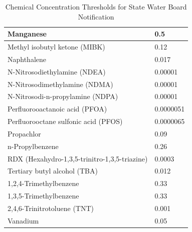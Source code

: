 \begin{table}[]
\begin{tabular}{|l|l|}
Manganese                                                   & 0.5                                             \\ \hline
Methyl   isobutyl   ketone   (MIBK)                         & 0.12                                            \\ \hline
Naphthalene                                                 & 0.017                                           \\ \hline
N-Nitrosodiethylamine   (NDEA)                              & 0.00001                                         \\ \hline
N-Nitrosodimethylamine   (NDMA)                             & 0.00001                                         \\ \hline
N-Nitrosodi-n-propylamine   (NDPA)                          & 0.00001                                         \\ \hline
Perfluorooactanoic   acid   (PFOA)                          & 0.0000051                                       \\ \hline
Perfluorooctane   sulfonic   acid   (PFOS)                  & 0.0000065                                       \\ \hline
Propachlor                                                  & 0.09                                            \\ \hline
n-Propylbenzene                                             & 0.26                                            \\ \hline
RDX (Hexahydro-1,3,5-trinitro-1,3,5-triazine)               & 0.0003                                          \\ \hline
Tertiary   butyl   alcohol   (TBA)                          & 0.012                                           \\ \hline
1,2,4-Trimethylbenzene                                      & 0.33                                            \\ \hline
1,3,5-Trimethylbenzene                                      & 0.33                                            \\ \hline
2,4,6-Trinitrotoluene   (TNT)                               & 0.001                                           \\ \hline
Vanadium                                                    & 0.05                                            \\ \hline
\end{tabular}
\caption{Chemical Concentration Thresholds for State Water Board Notification}

\end{table}
